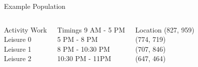\documentclass[10pt, aspectratio=169]{beamer}
\begin{document}
\begin{frame}{Example Population}
    \begin{columns}[T,onlytextwidth]
    

    
        \begin{block}{Activity}
        Work\\
        \vspace{1em}
        Leisure 0\\
        \vspace{1em}
        Leisure 1\\
        \vspace{1em}
        Leisure 2\\
        \vspace{1em}
        \end{block}


    
        \begin{alertblock}{Timings}
        9 AM - 5 PM\\
        \vspace{1em}
        5 PM - 8 PM\\
        \vspace{1em}
        8 PM - 10:30 PM\\
        \vspace{1em}
        10:30 PM - 11PM\\
        \vspace{1em}
        \end{alertblock}



        \begin{exampleblock}{Location}
            (827, 959)\\
            \vspace{0.92em}
            (774, 719)\\
            \vspace{0.92em}
            (707, 846)\\
            \vspace{0.92em}
            (647, 464)\\
            \vspace{0.92em}
        \end{exampleblock}
        
    \end{columns}
\end{frame}
\end{document}
